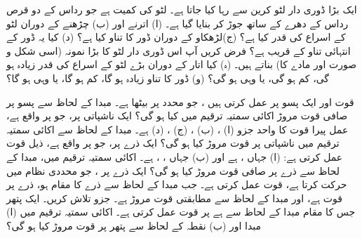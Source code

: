 ایک بڑا ڈوری دار لٹو کرین سے رہا کیا جاتا ہے۔ لٹو کی کمیت  ہے جو  رداس کے دو قرص  رداس کے دھرے کے ساتھ جوڑ کر بنایا گیا ہے۔ (ا) اترنے  اور (ب) چڑھنے کے دوران لٹو کے اسراع کی قدر کیا ہے؟ (ج)لڑھکاو کے دوران   ڈور کا تناو کیا ہے؟ (د)  کیا یہ   ڈور کے انتہائی  تناو  کے قریب ہے؟ فرض کریں آپ اس ڈوری دار لٹو کا  بڑا  نمونہ (اسی شکل و صورت اور مادے  کا)  بناتے ہیں۔ (ہ)  کیا اتار کے دوران بڑے لٹو کے اسراع کی قدر زیادہ ہو گی، کم ہو گی، یا وہی ہو گی؟ (و)  ڈور کا  تناو  زیادہ ہو گا، کم ہو گا، یا وہی ہو گا؟

قوت   اور    ایک پسو پر عمل کرتی ہیں ، جو  محدد پر بیٹھا ہے۔ مبدا  کے لحاظ سے پسو پر صافی قوت مروڑ اکائی سمتیہ ترقیم میں کیا ہو گی؟
ایک ناشپاتی   پر، جو  پر واقع ہے،  عمل پیرا قوت  کا واحد جزو (ا)  ،
 (ب)  ، (ج) ، (د)   ہے۔ مبدا کے لحاظ سے اکائی سمتیہ ترقیم میں ناشپاتی پر قوت مروڑ کیا ہو گی؟
ایک ذرے    پر، جو  پر واقع ہے،  ذیل قوت عمل کرتی ہے: (ا)   جہاں  ،  ہے اور (ب)   جہاں ، ، 
 ہے۔ اکائی سمتیہ ترقیم میں، مبدا کے لحاظ سے ذرے پر صافی قوت مروڑ کیا ہو گی؟
ایک ذرے پر ، جو  محددی نظام میں حرکت کرتا ہے، قوت عمل کرتی ہے۔ جب مبدا کے لحاظ سے  ذرے کا مقام 
ہو، ذرے پر قوت  ہے، اور مبدا کے لحاظ سے مطابقتی قوت مروڑ  ہے۔ جزو  تلاش کریں۔
ایک  پتھر   جس کا  مقام  مبدا کے لحاظ سے 
 ہے  پر قوت  عمل کرتی  ہے۔ اکائی سمتیہ ترقیم میں  (ا) مبدا  اور (ب) نقطہ  کے لحاظ سے پتھر پر قوت مروڑ کیا ہو گی؟
